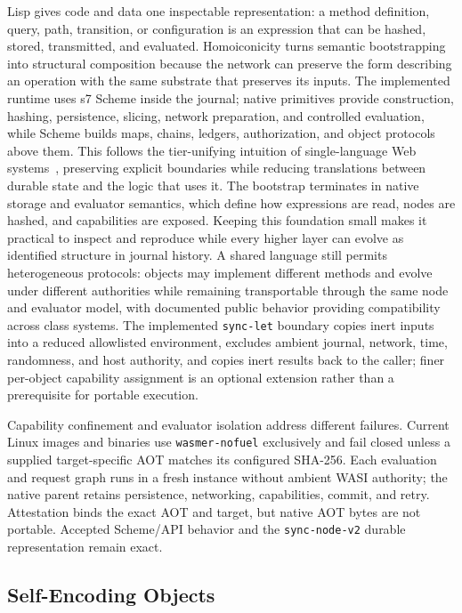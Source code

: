 Lisp gives code and data one inspectable representation: a method definition, query, path, transition, or configuration is an expression that can be hashed, stored, transmitted, and evaluated. Homoiconicity turns semantic bootstrapping into structural composition because the network can preserve the form describing an operation with the same substrate that preserves its inputs. The implemented runtime uses s7 Scheme inside the journal; native primitives provide construction, hashing, persistence, slicing, network preparation, and controlled evaluation, while Scheme builds maps, chains, ledgers, authorization, and object protocols above them. This follows the tier-unifying intuition of single-language Web systems~\cite{Cooper2007links}, preserving explicit boundaries while reducing translations between durable state and the logic that uses it. The bootstrap terminates in native storage and evaluator semantics, which define how expressions are read, nodes are hashed, and capabilities are exposed. Keeping this foundation small makes it practical to inspect and reproduce while every higher layer can evolve as identified structure in journal history. A shared language still permits heterogeneous protocols: objects may implement different methods and evolve under different authorities while remaining transportable through the same node and evaluator model, with documented public behavior providing compatibility across class systems. The implemented \texttt{sync-let} boundary copies inert inputs into a reduced allowlisted environment, excludes ambient journal, network, time, randomness, and host authority, and copies inert results back to the caller; finer per-object capability assignment is an optional extension rather than a prerequisite for portable execution.

Capability confinement and evaluator isolation address different failures. Current Linux images and binaries use \texttt{wasmer-nofuel} exclusively and fail closed unless a supplied target-specific AOT matches its configured SHA-256. Each evaluation and request graph runs in a fresh instance without ambient WASI authority; the native parent retains persistence, networking, capabilities, commit, and retry. Attestation binds the exact AOT and target, but native AOT bytes are not portable. Accepted Scheme/API behavior and the \texttt{sync-node-v2} durable representation remain exact.

\subsection{Self-Encoding Objects}

